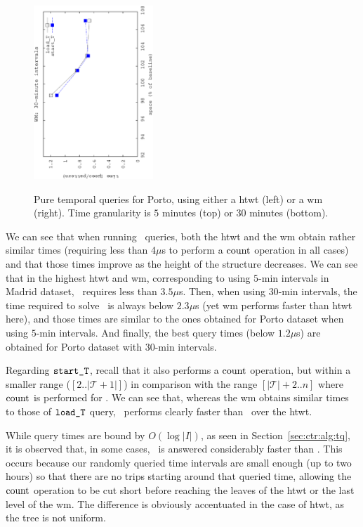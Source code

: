 \begin{figure}[ht]
\begin{center}
				{\includegraphics[angle=-90,width=0.4\textwidth]{figures_synt/porto_t30mwm.eps}}
		\end{center}
		\caption{Pure temporal queries for Porto, using either a \acrshort{htwt} (left) or a \acrshort{wm} (right). 
			Time granularity is $5$ minutes (top) or $30$ minutes (bottom).}
		\label{fig:ctr:exp:queries:temp:porto}
	\end{figure}



	We can see that when running \loadT\ queries, both the \gls{htwt} and the \gls{wm} obtain rather similar times (requiring less than 4$\mu$s 
	to perform a $\operatorname{count}$ operation in all cases) and that those times improve as the height of the structure decreases. We can see 
	that in the highest \gls{htwt} and \gls{wm}, corresponding to using $5$-min intervals in Madrid dataset, \loadT\ requires less
	than $3.5\mu$s. Then, when using $30$-min intervals, the time required to solve \loadT\ is always below $2.3\mu$s (yet
	\gls{wm} performs faster than \gls{htwt} here), and those times are similar to the ones obtained for Porto dataset when
	using $5$-min intervals. And finally, the best query times (below $1.2\mu$s) are obtained for Porto dataset with 
	$30$-min intervals.

	Regarding $\texttt{start\_T}$, recall that it also performs a $\operatorname{count}$ operation, but within a smaller range ($[2..|\mathcal{T}+1|]$) in comparison with the range
	$[|\mathcal{T}|+2..n]$ where  $\operatorname{count}$ is performed for \loadT. We can see that, whereas the \gls{wm} obtains similar times to those of 
	$\texttt{load\_T}$ query,  \startT\ performs clearly faster than \loadT\ over the \gls{htwt}.
	
	While query times are bound by $O(\log|I|)$, as seen in Section~\ref{sec:ctr:alg:tq}, it is observed that, in some cases, \startT\ is answered considerably faster than \loadT. This occurs because our randomly queried time intervals are small enough (up to two hours) so that there are no trips starting around that queried time, allowing the $\operatorname{count}$ operation to be cut short before reaching the leaves of the \gls{htwt} or the last level of the \gls{wm}. The difference is obviously accentuated in the case of \gls{htwt}, as the tree is not uniform.


